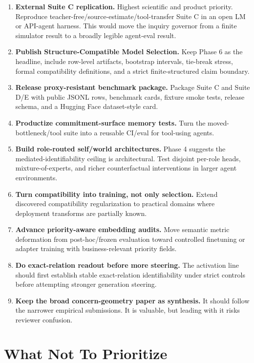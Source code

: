 \documentclass[11pt]{article}
\begin{document}
\begin{enumerate}
  \item \textbf{External Suite C replication.} Highest scientific and product
  priority. Reproduce teacher-free/source-estimate/tool-transfer Suite C in an
  open LM or API-agent harness. This would move the inquiry governor from a
  finite simulator result to a broadly legible agent-eval result.
  \item \textbf{Publish Structure-Compatible Model Selection.} Keep Phase 6 as
  the headline, include row-level artifacts, bootstrap intervals, tie-break
  stress, formal compatibility definitions, and a strict finite-structured
  claim boundary.
  \item \textbf{Release proxy-resistant benchmark package.} Package Suite C and
  Suite D/E with public JSONL rows, benchmark cards, fixture smoke tests,
  release schema, and a Hugging Face dataset-style card.
  \item \textbf{Productize commitment-surface memory tests.} Turn the
  moved-bottleneck/tool suite into a reusable CI/eval for tool-using agents.
  \item \textbf{Build role-routed self/world architectures.} Phase 4 suggests
  the mediated-identifiability ceiling is architectural. Test disjoint
  per-role heads, mixture-of-experts, and richer counterfactual interventions
  in larger agent environments.
  \item \textbf{Turn compatibility into training, not only selection.} Extend
  discovered compatibility regularization to practical domains where
  deployment transforms are partially known.
  \item \textbf{Advance priority-aware embedding audits.} Move semantic metric
  deformation from post-hoc/frozen evaluation toward controlled finetuning or
  adapter training with business-relevant priority fields.
  \item \textbf{Do exact-relation readout before more steering.} The activation
  line should first establish stable exact-relation identifiability under
  strict controls before attempting stronger generation steering.
  \item \textbf{Keep the broad concern-geometry paper as synthesis.} It should
  follow the narrower empirical submissions. It is valuable, but leading with
  it risks reviewer confusion.
\end{enumerate}

\section{What Not To Prioritize}
\end{document}
